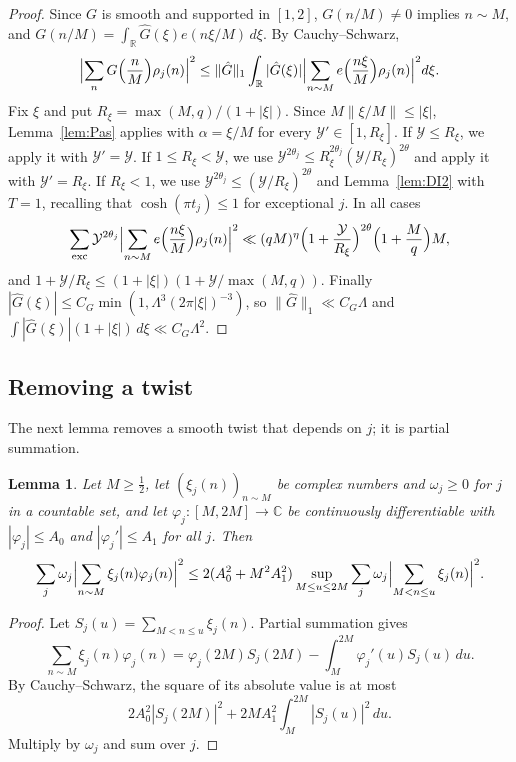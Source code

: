 \documentclass[11pt]{amsart}
\newtheorem{lemma}[theorem]{Lemma}
\theoremstyle{remark}
\theoremstyle{definition}
\numberwithin{equation}{section}
\newcommand{\R}{\mathbb{R}}
\newcommand{\C}{\mathbb{C}}
\newcommand{\exc}{\mathrm{exc}}
\begin{document}
\begin{proof}
Since $G$ is smooth and supported in $[1,2]$, $G(n/M)\ne0$ implies $n\sim M$, and $G(n/M)=\int_\R\hat G(\xi)e(n\xi/M)\,d\xi$. By Cauchy--Schwarz,
\[
\Bigl|\sum_nG\Bigl(\frac nM\Bigr)\rho_j(n)\Bigr|^2\le\|\hat G\|_1\int_\R|\hat G(\xi)|\Bigl|\sum_{n\sim M}e\Bigl(\frac{n\xi}M\Bigr)\rho_j(n)\Bigr|^2d\xi.
\]
Fix $\xi$ and put $R_\xi=\max(M,q)/(1+|\xi|)$. Since $M\|\xi/M\|\le|\xi|$, Lemma~\ref{lem:Pas} applies with $\alpha=\xi/M$ for every $\mathcal Y'\in[1,R_\xi]$. If $\mathcal Y\le R_\xi$, we apply it with $\mathcal Y'=\mathcal Y$. If $1\le R_\xi<\mathcal Y$, we use $\mathcal Y^{2\theta_j}\le R_\xi^{2\theta_j}(\mathcal Y/R_\xi)^{2\theta}$ and apply it with $\mathcal Y'=R_\xi$. If $R_\xi<1$, we use $\mathcal Y^{2\theta_j}\le(\mathcal Y/R_\xi)^{2\theta}$ and Lemma~\ref{lem:DI2} with $T=1$, recalling that $\cosh(\pi t_j)\le1$ for exceptional $j$. In all cases
\[
\sum_{\exc}\mathcal Y^{2\theta_j}\Bigl|\sum_{n\sim M}e\Bigl(\frac{n\xi}M\Bigr)\rho_j(n)\Bigr|^2\ll(qM)^\eta\Bigl(1+\frac{\mathcal Y}{R_\xi}\Bigr)^{2\theta}\Bigl(1+\frac Mq\Bigr)M,
\]
and $1+\mathcal Y/R_\xi\le(1+|\xi|)(1+\mathcal Y/\max(M,q))$. Finally $|\hat G(\xi)|\le C_G\min(1,\Lambda^3(2\pi|\xi|)^{-3})$, so $\|\hat G\|_1\ll C_G\Lambda$ and $\int|\hat G(\xi)|(1+|\xi|)\,d\xi\ll C_G\Lambda^2$.
\end{proof}

\subsection{Removing a twist}
The next lemma removes a smooth twist that depends on $j$; it is partial summation.

\begin{lemma}\label{lem:twist}
Let $M\ge\frac12$, let $(\xi_j(n))_{n\sim M}$ be complex numbers and $\omega_j\ge0$ for $j$ in a countable set, and let $\varphi_j:[M,2M]\to\C$ be continuously differentiable with $|\varphi_j|\le A_0$ and $|\varphi_j'|\le A_1$ for all $j$. Then
\[
\sum_j\omega_j\Bigl|\sum_{n\sim M}\xi_j(n)\varphi_j(n)\Bigr|^2\le2(A_0^2+M^2A_1^2)\sup_{M\le u\le2M}\sum_j\omega_j\Bigl|\sum_{M<n\le u}\xi_j(n)\Bigr|^2.
\]
\end{lemma}

\begin{proof}
Let $S_j(u)=\sum_{M<n\le u}\xi_j(n)$. Partial summation gives
\[
\sum_{n\sim M}\xi_j(n)\varphi_j(n)=\varphi_j(2M)S_j(2M)-\int_M^{2M}\varphi_j'(u)S_j(u)\,du.
\]
By Cauchy--Schwarz, the square of its absolute value is at most
\[
2A_0^2|S_j(2M)|^2+2MA_1^2\int_M^{2M}|S_j(u)|^2\,du.
\]
Multiply by $\omega_j$ and sum over $j$.
\end{proof}
\end{document}
